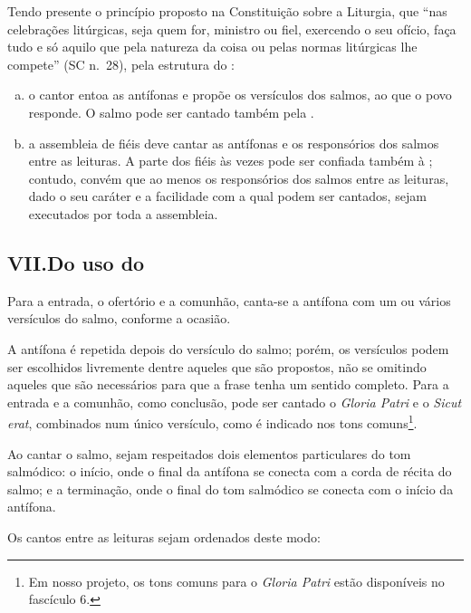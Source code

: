  Tendo presente o princípio proposto na Constituição sobre a Liturgia, que ``nas celebrações litúrgicas, seja quem for, ministro ou fiel, exercendo o seu ofício, faça tudo e só aquilo que pela natureza da coisa ou pelas normas litúrgicas lhe compete'' (SC n.\ 28), pela estrutura do {\GS}:
\begin{enumerate}[a)]
  \item o cantor entoa as antífonas e propõe os versículos dos salmos, ao que o povo responde. O salmo pode ser cantado também pela {\Schola}.

  \item a assembleia de fiéis deve cantar as antífonas e os responsórios dos salmos entre as leituras. A parte dos fiéis às vezes pode ser confiada também à {\Schola}; contudo, convém que ao menos os responsórios dos salmos entre as leituras, dado o seu caráter e a facilidade com a qual podem ser cantados, sejam executados por toda a assembleia.
\end{enumerate}

\subsection*{VII.\@ Do uso do {\GS}}
 Para a entrada, o ofertório e a comunhão, canta-se a antífona com um ou vários versículos do salmo, conforme a ocasião.

A antífona é repetida depois do versículo do salmo; porém, os versículos podem ser escolhidos livremente dentre aqueles que são propostos, não se omitindo aqueles que são necessários para que a frase tenha um sentido completo. Para a entrada e a comunhão, como conclusão, pode ser cantado o \textcolor{gregoriocolor}{\emph{Gloria Patri}} e o \textcolor{gregoriocolor}{\emph{Sicut erat}}, combinados num único versículo, como é indicado nos tons comuns\footnote{Em nosso projeto, os tons comuns para o \textcolor{gregoriocolor}{\emph{Gloria Patri}} estão disponíveis no fascículo 6.}.

Ao cantar o salmo, sejam respeitados dois elementos particulares do tom salmódico: o início, onde o final da antífona se conecta com a corda de récita do salmo; e a terminação, onde o final do tom salmódico se conecta com o início da antífona.

 Os cantos entre as leituras sejam ordenados deste modo:

